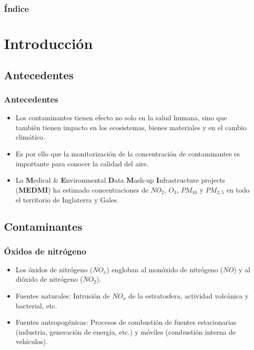 \documentclass[12pt]{beamer}
\begin{document}
\begin{frame}
\frametitle{Índice}
\footnotesize
\tableofcontents
\end{frame}

\section{Introducción}
\subsection{Antecedentes}
\begin{frame}
\frametitle{Antecedentes}
\begin{itemize}
\item<1-> Los contaminantes tienen efecto no solo en la salud humana, sino que también tienen impacto en los ecosistemas, bienes materiales y en el cambio climático.
\item<2-> Es por ello que la monitorización de la concentración de contaminantes es importante para conocer la calidad del aire.
\item<3-> La \textbf{M}edical \& \textbf{E}nvironmental \textbf{D}ata \textbf{M}ash-up \textbf{I}nfrastructure projects (\textbf{MEDMI}) ha estimado concentraciones de $NO_{2}$, $O_{3}$, $PM_{10}$ y $PM_{2,5}$ en todo el territorio de Inglaterra y Gales.
\end{itemize}
\end{frame}

\subsection{Contaminantes}
\begin{frame}
\frametitle{Óxidos de nitrógeno}
\begin{itemize}
\item<1-> Los óxidos de nitrógeno ($NO_{x}$) engloban al monóxido de nitrógeno ($NO$) y al dióxido de nitrógeno ($NO_{2}$).
\item<2-> Fuentes naturales: Intrusión de $NO_{x}$ de la estratosfera, actividad volcánica y bacterial, etc.
\item<3-> Fuentes antropogénicas: Procesos de combustión de fuentes estacionarias (industria, generación de energía, etc.) y móviles (combustión interna de vehículos).
\end{itemize}
\end{frame}
\end{document}
